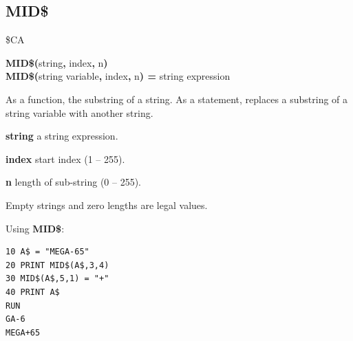 
\newpage
\subsection{MID\$}
\begin{description}[leftmargin=2cm,style=nextline]
\item [Token:] \$CA
\item [Format:] {\bf MID\$(}string{\bf,} index{\bf,} n{\bf)} \\
                {\bf MID\$(}string variable{\bf,} index{\bf,} n{\bf) =} string expression
\item [Usage:] As a function, the substring of a string. As a statement,
               replaces a substring of a string variable with another string.

               {\bf string} a string expression.

               {\bf index} start index (1 -- 255).

               {\bf n} length of sub-string (0 -- 255).

\item [Remarks:] Empty strings and zero lengths are legal values.

\item [Example:] Using {\bf MID\$}:
\begin{tcolorbox}[colback=black,coltext=white]
\verbatimfont{\codefont}
\begin{verbatim}
10 A$ = "MEGA-65"
20 PRINT MID$(A$,3,4)
30 MID$(A$,5,1) = "+"
40 PRINT A$
RUN
GA-6
MEGA+65
\end{verbatim}
\end{tcolorbox}
\end{description}


\newpage
